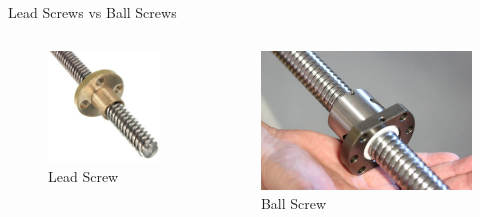 \documentclass[10pt, svgnames]{beamer}
\begin{document}
\begin{frame}[label={sec:orga65dcff}]{Lead Screws vs Ball Screws}
\begin{columns}
\begin{column}{0.5\columnwidth}
\begin{figure}[htbp]
\centering
\includegraphics[width=.9\linewidth]{pictures/lead-screw-closeup.jpg}
\caption{Lead Screw}
\end{figure}
\end{column}

\begin{column}{0.5\columnwidth}
\begin{figure}[htbp]
\centering
\includegraphics[width=.9\linewidth]{pictures/ball-screw-closeup.JPG}
\caption{Ball Screw}
\end{figure}
\end{column}
\end{columns}
\end{frame}
\end{document}

